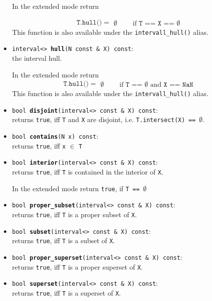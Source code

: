 \documentclass{report}
\begin{document}
\begin{itemize}
In the extended mode return	
				
				\[
					\texttt{T.hull()} =  \begin{array}{lcl}
					\emptyset&\textrm{\ }&\textrm{if \ }\texttt{T == X == $\emptyset$}
					\end{array}
				\]
				This function is also available under the \texttt{intervall\_hull()} 
				alias.
			\item \texttt{interval<> {\bf hull}(N const \& X)
					const}:\\ the interval hull.

In the extended mode return	
				\[
					\texttt{T.hull()} =  \begin{array}{lcl}
					\emptyset&\textrm{\ }&\textrm{if \ }\texttt{T == $\emptyset$}\textrm{ and }\texttt{X == NaN}
					\end{array}
				\]				
				This function is also available under the \texttt{intervall\_hull()} 
				alias.
			\item \texttt{bool {\bf disjoint}(interval<> const \& X) const}:\\ returns
				\texttt{true}, iff
				\texttt{T} and \texttt{X} are
				disjoint, i.e. \texttt{T.intersect(X) == $\emptyset$}.
			\item \texttt{bool {\bf contains}(N x) const}:\\returns
				\texttt{true}, iff \texttt{x} $\in$
				\texttt{T} 
			\item \texttt{bool {\bf interior}(interval<> const \& X) const}:\\ returns
				\texttt{true}, iff 
				\texttt{T} is contained in the
				interior of \texttt{X}.

			
	In the extended mode return \texttt{true}, if 
				\texttt{T == $\emptyset$}
					
			
			\item \texttt{bool {\bf proper\_subset}(interval<> const \& X) const}:\\ returns
				\texttt{true}, iff
				\texttt{T} is a proper subset of \texttt{X}.			
			\item \texttt{bool {\bf subset}(interval<> const \& X) const}:\\ returns
				\texttt{true}, iff
				\texttt{T} is a subset of \texttt{X}.

							

			\item \texttt{bool {\bf proper\_superset}(interval<> const \& X)
				const}:\\ returns
				\texttt{true}, iff
				\texttt{T} is a proper superset of \texttt{X}.
 
			\item \texttt{bool {\bf superset}(interval<> const \& X) const}:\\returns
				\texttt{true}, iff
				\texttt{T} is a superset of \texttt{X}.
\end{itemize}
\end{document}
